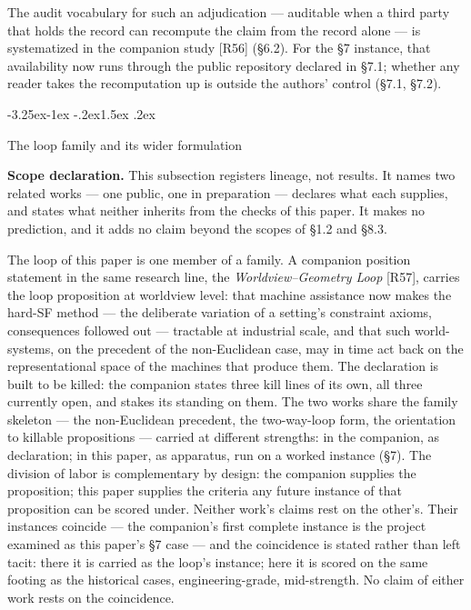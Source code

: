 \documentclass[11pt,a4paper]{article}
\makeatletter
\renewcommand\subsection{\@startsection{subsection}{2}{\z@}%
  {-3.25ex\@plus -1ex \@minus -.2ex}{1.5ex \@plus .2ex}%
  {\normalfont\large\bfseries\raggedright}}
\makeatother
\begin{document}
The audit vocabulary for such an adjudication — auditable when a third party that holds the record can recompute the claim from the record alone — is systematized in the companion study [R56] (§6.2). For the §7 instance, that availability now runs through the public repository declared in §7.1; whether any reader takes the recomputation up is outside the authors' control (§7.1, §7.2).

\subsection{The loop family and its wider formulation}

\textbf{Scope declaration.} This subsection registers lineage, not results. It names two related works — one public, one in preparation — declares what each supplies, and states what neither inherits from the checks of this paper. It makes no prediction, and it adds no claim beyond the scopes of §1.2 and §8.3.

The loop of this paper is one member of a family. A companion position statement in the same research line, the \textit{Worldview--Geometry Loop} [R57], carries the loop proposition at worldview level: that machine assistance now makes the hard-SF method — the deliberate variation of a setting's constraint axioms, consequences followed out — tractable at industrial scale, and that such world-systems, on the precedent of the non-Euclidean case, may in time act back on the representational space of the machines that produce them. The declaration is built to be killed: the companion states three kill lines of its own, all three currently open, and stakes its standing on them. The two works share the family skeleton — the non-Euclidean precedent, the two-way-loop form, the orientation to killable propositions — carried at different strengths: in the companion, as declaration; in this paper, as apparatus, run on a worked instance (§7). The division of labor is complementary by design: the companion supplies the proposition; this paper supplies the criteria any future instance of that proposition can be scored under. Neither work's claims rest on the other's. Their instances coincide — the companion's first complete instance is the project examined as this paper's §7 case — and the coincidence is stated rather than left tacit: there it is carried as the loop's instance; here it is scored on the same footing as the historical cases, engineering-grade, mid-strength. No claim of either work rests on the coincidence.
\end{document}
